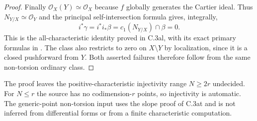 \begin{proof}
Finally $\mathcal O_X(Y)\simeq\mathcal O_X$ because $f$ globally
generates the Cartier ideal. Thus $N_{Y/X}\simeq\mathcal O_Y$ and
the principal self-intersection formula gives, integrally,
\[
             i^*\gamma=i^*i_*\beta
                         =c_1(N_{Y/X})\cap\beta=0.
\]
This is the all-characteristic identity proved in C.3al, with its
exact primary formulas in
\citet[Tags 0B3P, 02T8 and 0B6Z]{cyStacksPrincipalGysin}.
The class also restricts to zero on $X\setminus Y$ by localization,
since it is a closed pushforward from $Y$. Both asserted failures
therefore follow from the same non-torsion ordinary class.
\end{proof}

The proof leaves the positive-characteristic injectivity range
$N\ge2r$ undecided. For $N\le r$ the source has no codimension-$r$
points, so injectivity is automatic. The generic-point non-torsion
input uses the slope proof of C.3at and is not inferred from differential
forms or from a finite characteristic computation.
